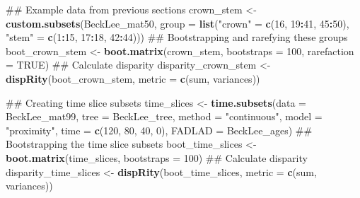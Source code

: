 \documentclass[]{book}
\newenvironment{Shaded}{\begin{snugshade}}{\end{snugshade}}
\newcommand{\KeywordTok}[1]{\textcolor[rgb]{0.13,0.29,0.53}{\textbf{#1}}}
\newcommand{\DataTypeTok}[1]{\textcolor[rgb]{0.13,0.29,0.53}{#1}}
\newcommand{\DecValTok}[1]{\textcolor[rgb]{0.00,0.00,0.81}{#1}}
\newcommand{\StringTok}[1]{\textcolor[rgb]{0.31,0.60,0.02}{#1}}
\newcommand{\OtherTok}[1]{\textcolor[rgb]{0.56,0.35,0.01}{#1}}
\newcommand{\OperatorTok}[1]{\textcolor[rgb]{0.81,0.36,0.00}{\textbf{#1}}}
\newcommand{\NormalTok}[1]{#1}
\theoremstyle{definition}
\theoremstyle{definition}
\theoremstyle{remark}
\begin{document}
\begin{Shaded}
\begin{Highlighting}[]
\NormalTok{## Example data from previous sections}
\NormalTok{crown_stem <-}\StringTok{ }\KeywordTok{custom.subsets}\NormalTok{(BeckLee_mat50,}
                                \DataTypeTok{group =} \KeywordTok{list}\NormalTok{(}\StringTok{"crown"}\NormalTok{ =}\StringTok{ }\KeywordTok{c}\NormalTok{(}\DecValTok{16}\NormalTok{, }\DecValTok{19}\OperatorTok{:}\DecValTok{41}\NormalTok{, }\DecValTok{45}\OperatorTok{:}\DecValTok{50}\NormalTok{), }
                                             \StringTok{"stem"}\NormalTok{ =}\StringTok{ }\KeywordTok{c}\NormalTok{(}\DecValTok{1}\OperatorTok{:}\DecValTok{15}\NormalTok{, }\DecValTok{17}\OperatorTok{:}\DecValTok{18}\NormalTok{, }\DecValTok{42}\OperatorTok{:}\DecValTok{44}\NormalTok{)))}
\NormalTok{## Bootstrapping and rarefying these groups}
\NormalTok{boot_crown_stem <-}\StringTok{ }\KeywordTok{boot.matrix}\NormalTok{(crown_stem, }\DataTypeTok{bootstraps =} \DecValTok{100}\NormalTok{, }\DataTypeTok{rarefaction =} \OtherTok{TRUE}\NormalTok{)}
\NormalTok{## Calculate disparity}
\NormalTok{disparity_crown_stem <-}\StringTok{ }\KeywordTok{dispRity}\NormalTok{(boot_crown_stem, }\DataTypeTok{metric =} \KeywordTok{c}\NormalTok{(sum, variances))}

\NormalTok{## Creating time slice subsets}
\NormalTok{time_slices <-}\StringTok{ }\KeywordTok{time.subsets}\NormalTok{(}\DataTypeTok{data =}\NormalTok{ BeckLee_mat99, }\DataTypeTok{tree =}\NormalTok{ BeckLee_tree, }
    \DataTypeTok{method =} \StringTok{"continuous"}\NormalTok{, }\DataTypeTok{model =} \StringTok{"proximity"}\NormalTok{, }\DataTypeTok{time =} \KeywordTok{c}\NormalTok{(}\DecValTok{120}\NormalTok{, }\DecValTok{80}\NormalTok{, }\DecValTok{40}\NormalTok{, }\DecValTok{0}\NormalTok{),}
    \DataTypeTok{FADLAD =}\NormalTok{ BeckLee_ages)}
\NormalTok{## Bootstrapping the time slice subsets}
\NormalTok{boot_time_slices <-}\StringTok{ }\KeywordTok{boot.matrix}\NormalTok{(time_slices, }\DataTypeTok{bootstraps =} \DecValTok{100}\NormalTok{)}
\NormalTok{## Calculate disparity}
\NormalTok{disparity_time_slices <-}\StringTok{ }\KeywordTok{dispRity}\NormalTok{(boot_time_slices, }\DataTypeTok{metric =} \KeywordTok{c}\NormalTok{(sum, variances))}


\end{Highlighting}
\end{Shaded}
\end{document}
